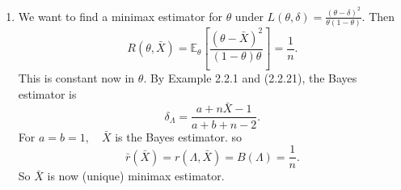 \documentclass[a4paper]{article}
\begin{document}
\begin{eg}
\begin{enumerate}
\begin{itemize}
\begin{equation*}
\begin{array}{l}
					n-2a(a+b) = 0 \\
				\end{array} \right\} \implies a = b = \frac{\sqrt{n}}{2}
			\end{equation*}
			We've shown if $\Lambda = Beta(\frac{\sqrt{n}}{2},\frac{\sqrt{n}}{2})$, then $\delta_{\Lambda}$ has constant risk
			\begin{equation}
				r(\Lambda,\delta_{\Lambda}) = \frac{a^2}{(a+b+n)^2} = \frac{1}{4(1+\sqrt{n})^2}
			\end{equation}
			By Theorem 2.4.1 (i), $\delta_{\Lambda}$ is minimax. In fact, since $\delta_{\Lambda}$ is the unique Bayes estimator for $\Lambda$, it is also unique minimax.
			\end{itemize}
			\begin{center}
			\end{center}
			Note: Risk is better only in a small interval around $\theta = \frac{1}{2}$. For large $n$, we would still prefer the maximum likelihood estimation.
		\item We want to find a minimax estimator for $\theta$ under $L(\theta,\delta) = \frac{(\theta - \delta)^2}{\theta(1-\theta)}$. Then
		\begin{equation}
			R(\theta,\bar{X}) = \mathbb{E}_\theta\left[\frac{(\theta - \bar{X})^2}{(1-\theta)\theta}\right] = \frac{1}{n}.
		\end{equation}
		This is constant now in $\theta$. By Example 2.2.1 and (2.2.21), the Bayes estimator is
		\begin{equation}
			\delta_{\Lambda} = \frac{a + n\bar{X} - 1}{a + b + n -2}.
		\end{equation}
		For $a = b = 1, \quad \bar{X}$ is the Bayes estimator. so
		\begin{equation}
			\bar{r}(\bar{X}) = r(\Lambda,\bar{X} )= B(\Lambda) = \frac{1}{n}.
		\end{equation}
		So $\bar{X}$ is now (unique) minimax estimator.
	\end{enumerate}
\end{eg}
\end{document}
